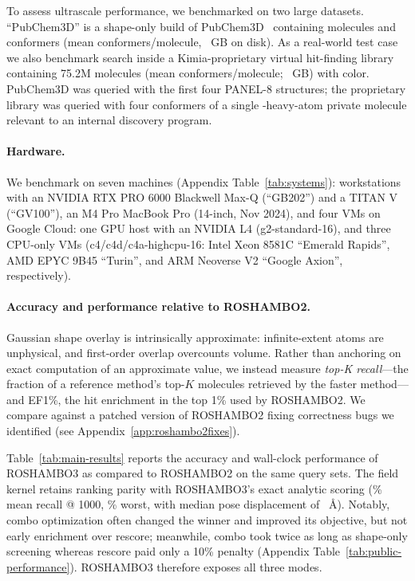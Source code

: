 \documentclass{article}
\begin{document}
To assess ultrascale performance, we benchmarked on two large datasets. ``PubChem3D''
is a shape-only build of PubChem3D~\citep{bolton2011pubchem3d} containing \DfiveMolecules{} molecules and
\DfiveConformers{} conformers (mean \DfiveMeanConformersPerMolecule{} conformers/molecule, \DfiveDiskGigabytes~GB on disk). As a real-world test case we also benchmark
search inside a Kimia-proprietary virtual hit-finding library containing 75.2M molecules (mean \ThreeCrMeanConformersPerMolecule{} conformers/molecule; \ThreeCrDiskGigabytes~GB) with color. PubChem3D
was queried with the first four PANEL-8 structures; the proprietary library was
queried with four conformers of a single \ThreeCrQueryHeavyAtoms-heavy-atom private molecule
relevant to an internal discovery program.

\paragraph{Hardware.} We benchmark on seven machines (Appendix Table~\ref{tab:systems}): workstations
with an NVIDIA RTX PRO 6000 Blackwell Max-Q (``GB202'') and a TITAN V (``GV100''), an M4 Pro MacBook Pro (14-inch, Nov 2024),
and four VMs on Google Cloud: one GPU host with an NVIDIA L4 (g2-standard-16), and three
CPU-only VMs (c4/c4d/c4a-highcpu-16: Intel Xeon 8581C ``Emerald Rapids'', AMD EPYC 9B45 ``Turin'', and ARM Neoverse V2 ``Google Axion'', respectively).

\paragraph{Accuracy and performance relative to ROSHAMBO2.} Gaussian shape
overlay is intrinsically approximate: infinite-extent atoms are unphysical, and
first-order overlap overcounts volume. Rather than anchoring on exact computation of an approximate value, we instead measure \emph{top-K recall}---the
fraction of a reference method's top-$K$ molecules retrieved by the faster
method---and EF1\%, the hit enrichment in the top 1\% used by ROSHAMBO2. We compare against a patched version of ROSHAMBO2 fixing correctness bugs we identified (see Appendix~\ref{app:roshambo2fixes}).

Table~\ref{tab:main-results} reports the accuracy and wall-clock performance of ROSHAMBO3 as compared to ROSHAMBO2 on the same query sets. The field kernel retains ranking parity with ROSHAMBO3's exact analytic scoring (\FieldPanelRecallAtThousandPercent\% mean recall @ 1000, \FieldWorstRecallAtThousandPercent\% worst, with median pose displacement of
\FieldMedianPoseRmsdAngstrom~\AA). Notably, combo optimization often changed the winner and improved its objective, but not early
enrichment over rescore; meanwhile, combo took twice as long as shape-only screening whereas rescore paid only a 10\% penalty (Appendix Table~\ref{tab:public-performance}). ROSHAMBO3 therefore exposes all three modes.
\end{document}
